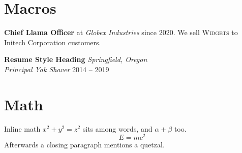 \documentclass[11pt]{article}
\newcommand{\role}[2]{\textbf{#1} at \emph{#2}}
\newcommand{\keyword}[1]{\textsc{#1}}
\newcommand{\company}{Initech Corporation}
\begin{document}
\section{Macros}
\role{Chief Llama Officer}{Globex Industries} since 2020.
We sell \keyword{Widgets} to \company{} customers.

\noindent\textbf{Resume Style Heading} \hfill \textit{Springfield, Oregon}\\
\textit{Principal Yak Shaver} \hfill 2014 -- 2019\\
{} \hfill {}

\section{Math}
Inline math $x^2 + y^2 = z^2$ sits among words, and $\alpha + \beta$ too.
\[ E = mc^2 \]
Afterwards a closing paragraph mentions a quetzal.
\end{document}
